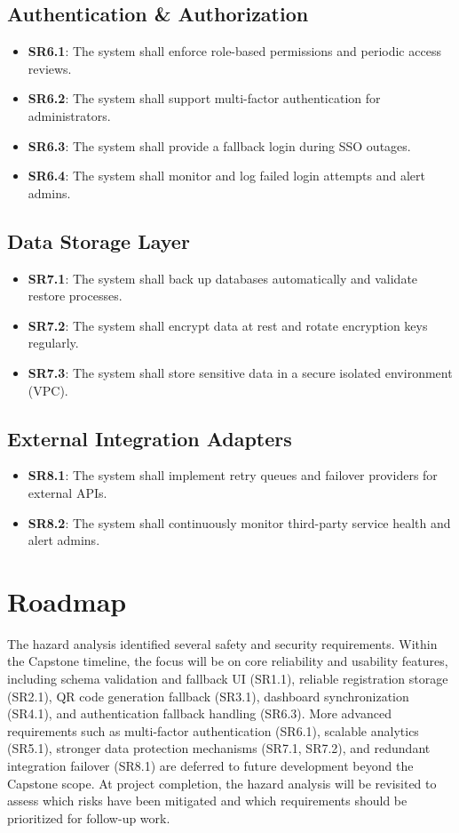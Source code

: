 \documentclass[12pt]{article}
\begin{document}
\subsection{Authentication \& Authorization}
\begin{itemize}
    \item \textbf{SR6.1}: The system shall enforce role-based permissions and periodic access reviews.
    \item \textbf{SR6.2}: The system shall support multi-factor authentication for administrators.
    \item \textbf{SR6.3}: The system shall provide a fallback login during SSO outages.
    \item \textbf{SR6.4}: The system shall monitor and log failed login attempts and alert admins.
\end{itemize}

\subsection{Data Storage Layer}
\begin{itemize}
    \item \textbf{SR7.1}: The system shall back up databases automatically and validate restore processes.
    \item \textbf{SR7.2}: The system shall encrypt data at rest and rotate encryption keys regularly.
    \item \textbf{SR7.3}: The system shall store sensitive data in a secure isolated environment (VPC).
\end{itemize}

\subsection{External Integration Adapters}
\begin{itemize}
    \item \textbf{SR8.1}: The system shall implement retry queues and failover providers for external APIs.
    \item \textbf{SR8.2}: The system shall continuously monitor third-party service health and alert admins.
\end{itemize}


\section{Roadmap}

The hazard analysis identified several safety and security requirements. Within the Capstone timeline, the focus will be on core reliability and usability features, including schema validation and fallback UI (SR1.1), reliable registration storage (SR2.1), QR code generation fallback (SR3.1), dashboard synchronization (SR4.1), and authentication fallback handling (SR6.3). More advanced requirements such as multi-factor authentication (SR6.1), scalable analytics (SR5.1), stronger data protection mechanisms (SR7.1, SR7.2), and redundant integration failover (SR8.1) are deferred to future development beyond the Capstone scope. At project completion, the hazard analysis will be revisited to assess which risks have been mitigated and which requirements should be prioritized for follow-up work.
\end{document}
